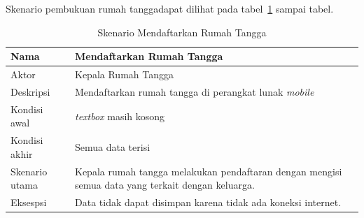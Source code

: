 Skenario pembukuan rumah tanggadapat dilihat  pada tabel~\ref{tab:mendaftar} sampai tabel.

\begin{table}[H]
	\centering
		\begin{tabular}{ |p{2cm}|p{10cm}| }
			\hline
			Nama &  Mendaftarkan Rumah Tangga\\ \hline
			Aktor & Kepala Rumah Tangga  \\ \hline
			Deskripsi & Mendaftarkan rumah tangga di perangkat lunak \textit{mobile} \\ \hline
			Kondisi awal & \textit{textbox} masih kosong  \\ \hline
			Kondisi akhir & Semua data terisi \\ \hline
			Skenario utama & Kepala rumah tangga melakukan pendaftaran dengan mengisi semua data yang terkait dengan keluarga. \\ \hline
			Eksespsi & Data tidak dapat disimpan karena tidak ada koneksi internet.  \\ 
			\hline
		\end{tabular}
	\caption{Skenario Mendaftarkan Rumah Tangga}
	\label{tab:mendaftar}
\end{table}
